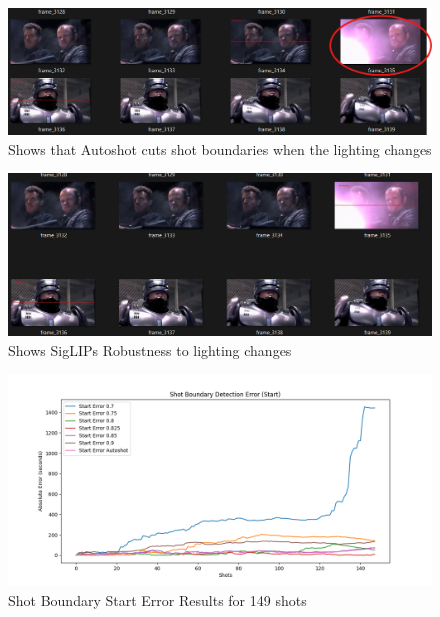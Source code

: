 \documentclass[12pt]{report}
\begin{document}
\begin{figure}[h]  %
	\centering
	\includegraphics[width=\linewidth]{autoshot_lighting_impact.png}  %
	\caption{Shows that Autoshot cuts shot boundaries when the lighting changes}
	\label{fig:autoshot_lighting_imapact}
\end{figure}
\begin{figure}[h]  %
	\centering
	\includegraphics[width=\linewidth]{siglip_ligting_impact.png}  %
	\caption{Shows SigLIPs Robustness to lighting changes}
	\label{fig:siglip_lighting_imapact}
\end{figure}
		\begin{figure}[h]  %
		\centering
		\includegraphics[width=\linewidth]{sbd_start_error.png}  %
		\caption{Shot Boundary Start Error Results for 149 shots}
		\label{fig:sbd_start_error}
	\end{figure}
	
\end{document}
